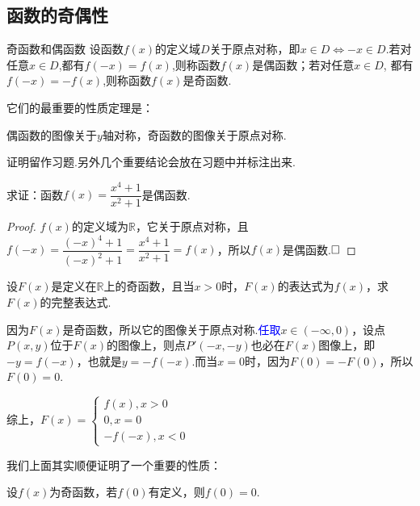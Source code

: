 \documentclass[lang=cn,math=cm,chinesefont=nofont,11pt,scheme=chinese,twocol]{elegantbook}
\begin{document}
\subsection{函数的奇偶性}

\begin{definition}{奇函数和偶函数}
  设函数$f(x)$的定义域$D$关于原点对称，即$x\in D\Leftrightarrow-x\in D$.若对任意$x\in D$,都有$f(-x)=f(x)$,则称函数$f(x)$是偶函数；若对任意$x\in D$, 都有$f(-x)=-f(x)$,则称函数$f(x)$是奇函数.
\end{definition}

它们的最重要的性质定理是：

\begin{property}
  偶函数的图像关于$y$轴对称，奇函数的图像关于原点对称.
\end{property}

证明留作习题.另外几个重要结论会放在习题中并标注出来.

\begin{example}
  求证：函数$f(x)=\dfrac{x^{4}+1}{x^{2}+1}$是偶函数.
\end{example}

\begin{proof}
  $f(x)$的定义域为$\mathbb{R}$，它关于原点对称，且$f(-x)=\dfrac{(-x)^{4}+1}{(-x)^{2}+1}=\dfrac{x^{4}+1}{x^{2}+1}=f(x)$，所以$f(x)$是偶函数.$\hfill\square$
\end{proof}

\begin{example}
  设$F(x)$是定义在$\mathbb{R}$上的奇函数，且当$x>0$时，$F(x)$的表达式为$f(x)$，求$F(x)$的完整表达式.
\end{example}

\begin{solution}
  因为$F(x)$是奇函数，所以它的图像关于原点对称.\textcolor{blue}{任取}$x\in(-\infty,0)$，设点$P(x,y)$位于$F(x)$的图像上，则点$P'(-x,-y)$也必在$F(x)$图像上，即$-y=f(-x)$，也就是$y=-f(-x)$.而当$x=0$时，因为$F(0)=-F(0)$，所以$F(0)=0$.

  综上，$F(x)=
  \begin{cases}
    f(x),x>0
    \\0,x=0
    \\-f(-x),x<0
  \end{cases}$
\end{solution}

我们上面其实顺便证明了一个重要的性质：

\begin{property}
  设$f(x)$为奇函数，若$f(0)$有定义，则$f(0)=0$.
\end{property}
\end{document}
